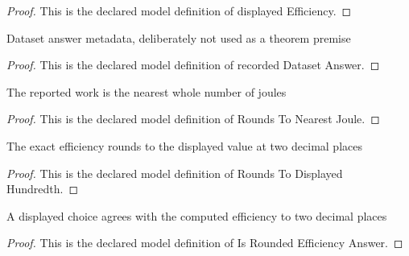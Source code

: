 \begin{proof}
  This is the declared model definition of displayed Efficiency.
\end{proof}
\begin{definition}
  \label{def:physics:phyx-mini-0430:phyxminiproblems-problemphyxmini0430-recordeddatasetanswer}
  Dataset answer metadata, deliberately not used as a theorem premise
\end{definition}
\begin{proof}
  This is the declared model definition of recorded Dataset Answer.
\end{proof}
\begin{definition}
  \label{def:physics:phyx-mini-0430:phyxminiproblems-problemphyxmini0430-roundstonearestjoule}
  The reported work is the nearest whole number of joules
\end{definition}
\begin{proof}
  This is the declared model definition of Rounds To Nearest Joule.
\end{proof}
\begin{definition}
  \label{def:physics:phyx-mini-0430:phyxminiproblems-problemphyxmini0430-roundstodisplayedhundredth}
  The exact efficiency rounds to the displayed value at two decimal places
\end{definition}
\begin{proof}
  This is the declared model definition of Rounds To Displayed Hundredth.
\end{proof}
\begin{definition}
  \label{def:physics:phyx-mini-0430:phyxminiproblems-problemphyxmini0430-isroundedefficiencyanswer}
  A displayed choice agrees with the computed efficiency to two decimal places
\end{definition}
\begin{proof}
  This is the declared model definition of Is Rounded Efficiency Answer.
\end{proof}

